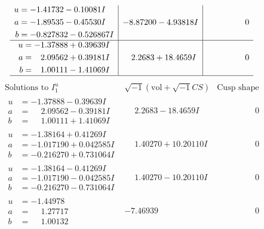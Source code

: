 \documentclass[1p]{elsarticle_modified}
\theoremstyle{definition}
\newcommand{\I}{\sqrt{-1}}
\begin{document}
$$\begin{array}{c|c|c}
\begin{aligned}
u &= -1.41732 - 0.10081 I \\
a &= -1.89535 - 0.45530 I \\
b &= -0.827832 - 0.526867 I\end{aligned}
 & -8.87200 - 4.93818 I & \phantom{-0.000000 } 0 \\ \hline\begin{aligned}
u &= -1.37888 + 0.39639 I \\
a &= \phantom{-}2.09562 + 0.39181 I \\
b &= \phantom{-}1.00111 - 1.41069 I\end{aligned}
 & \phantom{-}2.2683 + 18.4659 I & \phantom{-0.000000 } 0\\
 \hline 
 \end{array}$$\newpage$$\begin{array}{c|c|c}  
\text{Solutions to }I^u_{1}& \I (\text{vol} + \sqrt{-1}CS) & \text{Cusp shape}\\
 \hline 
\begin{aligned}
u &= -1.37888 - 0.39639 I \\
a &= \phantom{-}2.09562 - 0.39181 I \\
b &= \phantom{-}1.00111 + 1.41069 I\end{aligned}
 & \phantom{-}2.2683 - 18.4659 I & \phantom{-0.000000 } 0 \\ \hline\begin{aligned}
u &= -1.38164 + 0.41269 I \\
a &= -1.017190 + 0.042585 I \\
b &= -0.216270 + 0.731064 I\end{aligned}
 & \phantom{-}1.40270 + 10.20110 I & \phantom{-0.000000 } 0 \\ \hline\begin{aligned}
u &= -1.38164 - 0.41269 I \\
a &= -1.017190 - 0.042585 I \\
b &= -0.216270 - 0.731064 I\end{aligned}
 & \phantom{-}1.40270 - 10.20110 I & \phantom{-0.000000 } 0 \\ \hline\begin{aligned}
u &= -1.44978\phantom{ +0.000000I} \\
a &= \phantom{-}1.27717\phantom{ +0.000000I} \\
b &= \phantom{-}1.00132\phantom{ +0.000000I}\end{aligned}
 & -7.46939\phantom{ +0.000000I} & \phantom{-0.000000 } 0 \\ \hline\begin{aligned}

\end{aligned}
\end{array}$$
\end{document}
